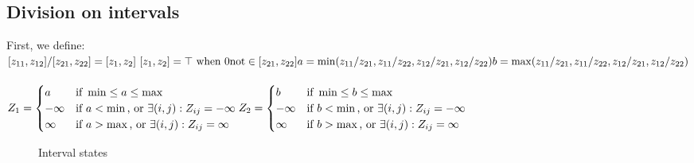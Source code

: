 \subsection{Division on intervals}
First, we define:\\
$
[z_{11}, z_{12}] / [z_{21}, z_{22}] = [z_{1}, z_{2}]\
[z_{1}, z_{2}] = \top \text{ when } 0 \text{not} \in [z_{21}, z_{22}]\\
a = \min(z_{11} / z_{21}, z_{11} / z_{22}, z_{12} / z_{21}, z_{12} / z_{22})\\
b = \max(z_{11} / z_{21}, z_{11} / z_{22}, z_{12} / z_{21}, z_{12} / z_{22})\\
$\\\\
$Z_1 =
     \begin{cases} 
        a       & \text{if } \min \leq a \leq \max \\
        -\infty & \text{if } a < \min \text{, or } \exists (i,j) : {Z_{ij} = -\infty} \\
        \infty & \text{if } a > \max \text{, or } \exists (i,j) : {Z_{ij} = \infty} \\
     \end{cases}\\
Z_2 =
     \begin{cases} 
        b       & \text{if } \min \leq b \leq \max \\
        -\infty & \text{if } b < \min \text{, or } \exists (i,j) : {Z_{ij} = -\infty} \\
        \infty & \text{if } b > \max \text{, or } \exists (i,j) : {Z_{ij} = \infty} \\
     \end{cases}
$\\

\begin{figure}
\centering
\caption{Interval states}
\label{figure:interval_states}
\end{figure}


